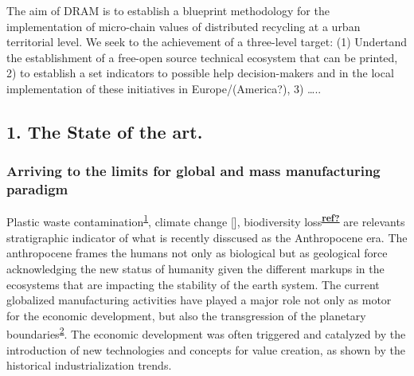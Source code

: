 \documentclass[
  11pt,
  a4paperpaper,
  onecolumn]{article}
\begin{document}
\begin{tcolorbox}[enhanced jigsaw, opacitybacktitle=0.6, colbacktitle=quarto-callout-note-color!10!white, opacityback=0, coltitle=black, arc=.35mm, rightrule=.15mm, toptitle=1mm, colframe=quarto-callout-note-color-frame, breakable, toprule=.15mm, colback=white, title=\textcolor{quarto-callout-note-color}{\faInfo}\hspace{0.5em}{DRAM in a nutshell}, bottomtitle=1mm, titlerule=0mm, bottomrule=.15mm, leftrule=.75mm, left=2mm]
The aim of DRAM is to establish a blueprint methodology for the
implementation of micro-chain values of distributed recycling at a urban
territorial level. We seek to the achievement of a three-level target:
(1) Undertand the establishment of a free-open source technical
ecosystem that can be printed, 2) to establish a set indicators to
possible help decision-makers and in the local implementation of these
initiatives in Europe/(America?), 3) \ldots..
\end{tcolorbox}

\hypertarget{the-state-of-the-art.}{%
\subsection{1. The State of the art.}\label{the-state-of-the-art.}}

\linenumbers

\hypertarget{arriving-to-the-limits-for-global-and-mass-manufacturing-paradigm}{%
\subsubsection{Arriving to the limits for global and mass manufacturing
paradigm}\label{arriving-to-the-limits-for-global-and-mass-manufacturing-paradigm}}

Plastic waste
contamination\textsuperscript{\protect\hyperlink{ref-de-la-torre2021}{1}},
climate change {[}{]}, biodiversity
loss\textsuperscript{\protect\hyperlink{ref-ref}{\textbf{ref?}}} are
relevants stratigraphic indicator of what is recently disscused as the
Anthropocene era. The anthropocene frames the humans not only as
biological but as geological force acknowledging the new status of
humanity given the different markups in the ecosystems that are
impacting the stability of the earth system. The current globalized
manufacturing activities have played a major role not only as motor for
the economic development, but also the transgression of the planetary
boundaries\textsuperscript{\protect\hyperlink{ref-ONeill2018}{2}}. The
economic development was often triggered and catalyzed by the
introduction of new technologies and concepts for value creation, as
shown by the historical industrialization trends.
\end{document}
